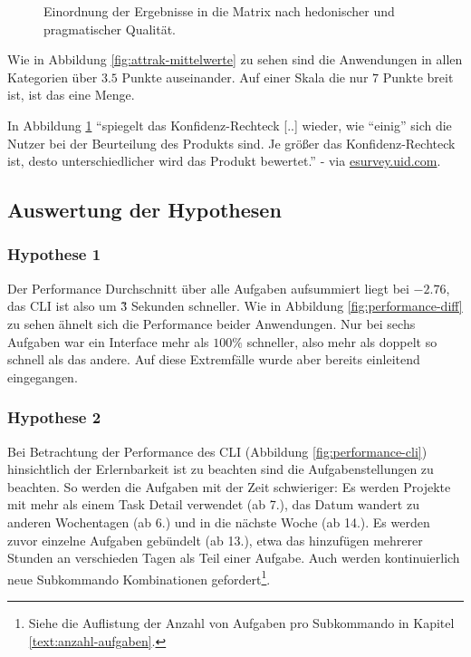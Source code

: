 \documentclass[oneside,bibliography=totocnumbered,BCOR=5mm]{scrbook}
\begin{document}
\begin{figure}[H]
\begin{minipage}[b]{0.4\textwidth}
    \caption{Einordnung der Ergebnisse in die Matrix nach hedonischer und pragmatischer Qualität.}
    \label{fig:attrak-portfolio}
  \end{minipage}
\end{figure}

Wie in Abbildung \ref{fig:attrak-mittelwerte} zu sehen sind die Anwendungen in
allen Kategorien über $3.5$ Punkte auseinander. Auf einer Skala die nur $7$
Punkte breit ist, ist das eine Menge.

\medskip

In Abbildung \ref{fig:attrak-portfolio} ``spiegelt das Konfidenz-Rechteck
[..] wieder, wie ``einig'' sich die Nutzer bei der Beurteilung
des Produkts sind. Je größer das Konfidenz-Rechteck ist, desto
unterschiedlicher wird das Produkt bewertet.'' - \textcite{attrakdiff} via
\href{https://esurvey.uid.com/}{esurvey.uid.com}.

\subsection{Auswertung der Hypothesen}

\subsubsection{Hypothese 1}

Der Performance Durchschnitt über alle Aufgaben aufsummiert liegt bei
$-2.76$, das CLI ist also um \~3 Sekunden schneller. Wie in Abbildung
\ref{fig:performance-diff} zu sehen ähnelt sich die Performance beider
Anwendungen. Nur bei sechs Aufgaben war ein Interface mehr als $100\%$
schneller, also mehr als doppelt so schnell als das andere. Auf diese
Extremfälle wurde aber bereits einleitend eingegangen.

\subsubsection{Hypothese 2}

Bei Betrachtung der Performance des CLI (Abbildung \ref{fig:performance-cli})
hinsichtlich der Erlernbarkeit ist zu beachten sind die Aufgabenstellungen zu
beachten. So werden die Aufgaben mit der Zeit schwieriger: Es werden Projekte
mit mehr als einem Task Detail verwendet (ab 7.), das Datum wandert zu anderen
Wochentagen (ab 6.) und in die nächste Woche (ab 14.). Es werden zuvor einzelne
Aufgaben gebündelt (ab 13.), etwa das hinzufügen mehrerer Stunden an verschieden
Tagen als Teil einer Aufgabe. Auch werden kontinuierlich neue Subkommando
Kombinationen gefordert\footnote{Siehe die Auflistung der Anzahl von Aufgaben
pro Subkommando in Kapitel \ref{text:anzahl-aufgaben}.}.
\end{document}
